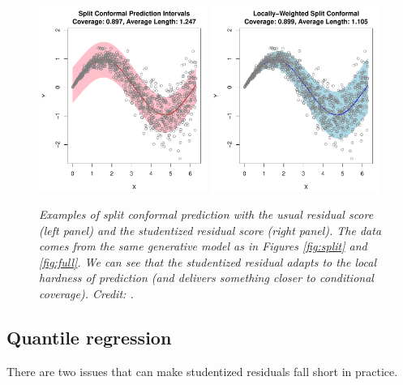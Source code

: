 \documentclass{article}
\begin{document}
\begin{figure}[htb]
\centering
\includegraphics[width=0.49\textwidth]{split_usual.pdf}
\includegraphics[width=0.49\textwidth]{split_student.pdf}
\caption{\it Examples of split conformal prediction with the usual residual
  score (left panel) and the studentized residual score (right panel). The data
  comes from the same generative model as in Figures \ref{fig:split} and 
  \ref{fig:full}. We can see that the studentized residual adapts to the local
  hardness of prediction (and delivers something closer to conditional
  coverage). Credit: \citet{lei2018distribution}.} 
\label{fig:student}
\end{figure}

\subsection{Quantile regression}

There are two issues that can make studentized residuals fall short in practice.   
\end{document}
